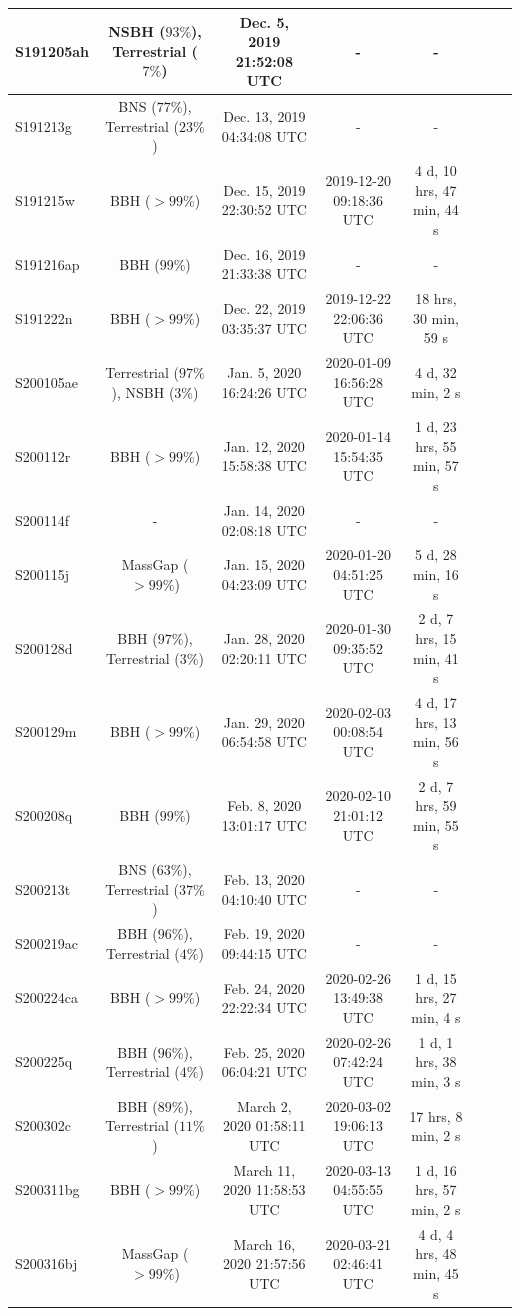 \begin{table}
{\begin{tabular}{l*{6}{c}r}
\hline
S191205ah & NSBH ($93\%$), Terrestrial ($7\%$) & 
Dec. 5, 2019 21:52:08 UTC & - & - \\
\hline
S191213g & BNS ($77\%$), Terrestrial ($23\%$) & 
Dec. 13, 2019 04:34:08 UTC & - & - \\
\hline
S191215w & BBH ($>99\%$) & 
Dec. 15, 2019 22:30:52 UTC & 2019-12-20 09:18:36 UTC & 4 d, 
10 hrs, 47 min, 44 s \\
\hline
S191216ap & BBH ($99\%$) & Dec. 16, 2019 21:33:38 UTC & - & - \\
\hline
S191222n & BBH ($>99\%$) & Dec. 22, 2019 03:35:37 UTC & 2019-12-22 22:06:36 UTC 
& 18 hrs, 30 min, 59 s \\
\hline
S200105ae & Terrestrial ($97\%$), NSBH ($3\%$) & Jan. 5, 2020 16:24:26 UTC
& 2020-01-09 16:56:28 UTC & 4 d, 32 min, 2 s \\
\hline
S200112r & BBH ($>99\%$) & Jan. 12, 2020 15:58:38 UTC & 2020-01-14 15:54:35 UTC 
& 1 d, 23 hrs, 55 min, 57 s \\
\hline
S200114f & - & Jan. 14, 2020 02:08:18 UTC & - & - \\
\hline
S200115j & MassGap ($>99\%$) & Jan. 15, 2020 04:23:09 UTC & 
2020-01-20 04:51:25 UTC & 5 d, 28 min, 16 s \\
\hline 
S200128d & BBH ($97\%$), Terrestrial ($3\%$) & Jan. 28, 2020 02:20:11 UTC 
& 2020-01-30 09:35:52 UTC & 2 d, 7 hrs, 15 min, 41 s \\ 
\hline 
S200129m & BBH ($>99\%$) & Jan. 29, 2020 06:54:58 UTC & 
2020-02-03 00:08:54 UTC & 4 d, 17 hrs, 13 min, 56 s \\
\hline
S200208q & BBH ($99\%$) & Feb. 8, 2020 13:01:17 UTC & 2020-02-10 21:01:12 UTC 
& 2 d, 7 hrs, 59 min, 55 s \\
\hline
S200213t & BNS ($63\%$), Terrestrial ($37\%$) & Feb. 13, 2020 04:10:40 UTC 
& - & - \\
\hline
S200219ac & BBH ($96\%$), Terrestrial ($4\%$) & Feb. 19, 2020 09:44:15 UTC 
& - & - \\
\hline
S200224ca & BBH ($>99\%$) & Feb. 24, 2020 22:22:34 UTC & 
2020-02-26 13:49:38 UTC &  1 d, 15 hrs, 27 min, 4 s \\ 
\hline
S200225q & BBH ($96\%$), Terrestrial ($4\%$) & Feb. 25, 2020 06:04:21 UTC 
& 2020-02-26 07:42:24 UTC & 1 d, 1 hrs, 38 min, 3 s \\
\hline
S200302c & BBH ($89\%$), Terrestrial ($11\%$) & March 2, 2020 01:58:11 UTC 
& 2020-03-02 19:06:13 UTC & 17 hrs, 8 min, 2 s \\
\hline
S200311bg & BBH ($>99\%$) & March 11, 2020 11:58:53 UTC & 
2020-03-13 04:55:55 UTC & 1 d, 16 hrs, 57 min, 2 s \\
\hline
S200316bj & MassGap ($>99\%$) & March 16, 2020 21:57:56 UTC & 
2020-03-21 02:46:41 UTC & 4 d, 4 hrs, 48 min, 45 s \\
\hline
\end{tabular}    
}
\end{table}

